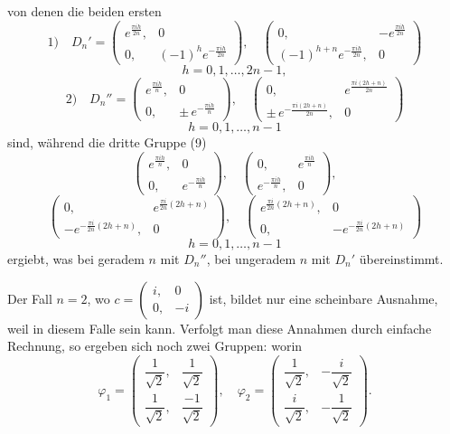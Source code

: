 von denen die beiden ersten
\[
1)\quad D_n' = \begin{pmatrix} e^{\frac{\pi i h}{2n}}, & 0 \\ 0, & (-1)^h e^{-\frac{\pi i h}{2n}} \end{pmatrix},\quad
\begin{pmatrix} 0, & -e^{\frac{\pi i h}{2n}} \\ (-1)^{h+n} e^{-\frac{\pi i h}{2n}}, & 0 \end{pmatrix}
\]
\[
h = 0, 1, \ldots, 2n-1,
\]
\[
2)\quad D_n'' = \begin{pmatrix} e^{\frac{\pi i h}{n}}, & 0 \\ 0, & \pm\, e^{-\frac{\pi i h}{n}} \end{pmatrix},\quad
\begin{pmatrix} 0, & e^{\frac{\pi i (2h+n)}{2n}} \\ \pm\, e^{-\frac{\pi i (2h+n)}{2n}}, & 0 \end{pmatrix}
\]
\[
h = 0, 1, \ldots, n-1
\]
sind, während die dritte Gruppe (9)
\[
\begin{pmatrix} e^{\frac{\pi i h}{n}}, & 0 \\ 0, & e^{-\frac{\pi i h}{n}} \end{pmatrix},\quad
\begin{pmatrix} 0, & e^{\frac{\pi i h}{n}} \\ e^{-\frac{\pi i h}{n}}, & 0 \end{pmatrix},
\]
\[
\begin{pmatrix} 0, & e^{\frac{\pi i}{2n}(2h+n)} \\ -e^{-\frac{\pi i}{2n}(2h+n)}, & 0 \end{pmatrix},\quad
\begin{pmatrix} e^{\frac{\pi i}{2n}(2h+n)}, & 0 \\ 0, & -e^{-\frac{\pi i}{2n}(2h+n)} \end{pmatrix}
\]
\[
h = 0, 1, \ldots, n-1
\]
ergiebt, was bei geradem $n$ mit $D_n''$, bei ungeradem $n$ mit $D_n'$ übereinstimmt.

Der Fall $n=2$, wo $c = \begin{pmatrix} i, & 0 \\ 0, & -i \end{pmatrix}$ ist, bildet nur eine scheinbare Ausnahme, weil in diesem Falle
sein kann. Verfolgt man diese Annahmen durch einfache Rechnung, so ergeben sich noch zwei Gruppen:
worin
\[
\varphi_1 = \begin{pmatrix} \dfrac{1}{\sqrt2}, & \dfrac{1}{\sqrt2} \\ \dfrac{1}{\sqrt2}, & \dfrac{-1}{\sqrt2} \end{pmatrix},\quad
\varphi_2 = \begin{pmatrix} \dfrac{1}{\sqrt2}, & -\dfrac{i}{\sqrt2} \\ \dfrac{i}{\sqrt2}, & -\dfrac{1}{\sqrt2} \end{pmatrix}.
\]

